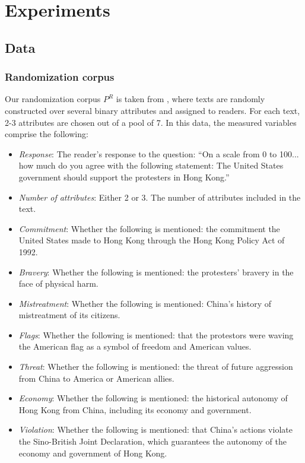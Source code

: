\documentclass{article}
\newcommand{\vl}[1]{\textcolor{orange}{[VL: #1]}}
\begin{document}

\section{Experiments}

\subsection{Data}

\subsubsection{Randomization corpus}

Our randomization corpus $P^R$ is taken from \cite{fong2021causal}, where texts are randomly constructed over several binary attributes and assigned to readers. For each text, 2-3 attributes are chosen out of a pool of 7. In this data, the measured variables comprise the following:
\begin{itemize}
    \item \textit{Response}: The reader's response to the question: ``On a scale from 0 to 100... how much do you agree with the following statement: The United States government should support the protesters in Hong Kong.''
    \item \textit{Number of attributes}: Either 2 or 3. The number of attributes included in the text.
    \item \textit{Commitment}: Whether the following is mentioned: the commitment the United States made to Hong Kong through the Hong Kong Policy Act of 1992.
    \item \textit{Bravery}: Whether the following is mentioned: the protesters' bravery in the face of physical harm.
    \item \textit{Mistreatment}: Whether the following is mentioned: China's history of mistreatment of its citizens.
    \item \textit{Flags}: Whether the following is mentioned: that the protestors were waving the American flag as a symbol of freedom and American values.
    \item \textit{Threat}: Whether the following is mentioned: the threat of future aggression from China to America or American allies.
    \item \textit{Economy}: Whether the following is mentioned: the historical autonomy of Hong Kong from China, including its economy and government.
    \item \textit{Violation}: Whether the following is mentioned: that China's actions violate the Sino-British Joint Declaration, which guarantees the autonomy of the economy and government of Hong Kong.
\end{itemize}
\end{document}
